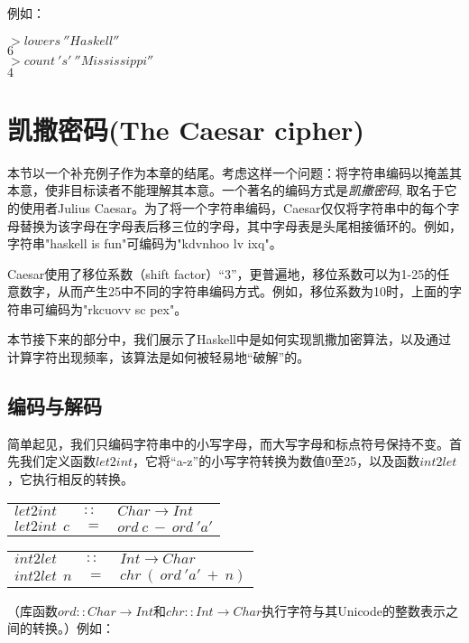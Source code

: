 例如：

\noindent\hspace*{1cm}$>lowers~''Haskell''$\\
\hspace*{1cm}$6$\\

\noindent\hspace*{1cm}$>count~'s'~''Mississippi''$\\
\hspace*{1cm}$4$\\

\section{凯撒密码(The Caesar cipher)}
本节以一个补充例子作为本章的结尾。考虑这样一个问题：将字符串编码以掩盖其本意，使非目标读者不能理解其本意。一个著名的编码方式是\textit{凯撒密码}, 取名于它的使用者Julius Caesar。为了将一个字符串编码，Caesar仅仅将字符串中的每个字母替换为该字母在字母表后移三位的字母，其中字母表是头尾相接循环的。例如，字符串"haskell is fun"可编码为"kdvnhoo lv ixq"。

Caesar使用了移位系数（shift factor）“3”，更普遍地，移位系数可以为1-25的任意数字，从而产生25中不同的字符串编码方式。例如，移位系数为10时，上面的字符串可编码为"rkcuovv sc pex"。

本节接下来的部分中，我们展示了Haskell中是如何实现凯撒加密算法，以及通过计算字符出现频率，该算法是如何被轻易地“破解”的。

\subsection{编码与解码}
简单起见，我们只编码字符串中的小写字母，而大写字母和标点符号保持不变。首先我们定义函数$let2int$，它将“a-z”的小写字符转换为数值0至25，以及函数$int2let$，它执行相反的转换。

\begin{tabular}[t]{lll}
$let2int$&$::$&$Char \rightarrow Int$\\
$let2int~~c$&$=$&$ord~c~-~ord~'a'$\\
\end{tabular}

\begin{tabular}[t]{lll}
$int2let$&$::$&$Int \rightarrow Char$\\
$int2let~~n$&$=$&$chr~(~ord~'a'~+~n)$\\
\end{tabular}

（库函数$ord::Char \rightarrow Int$和$chr::Int \rightarrow Char$执行字符与其Unicode的整数表示之间的转换。）例如：

